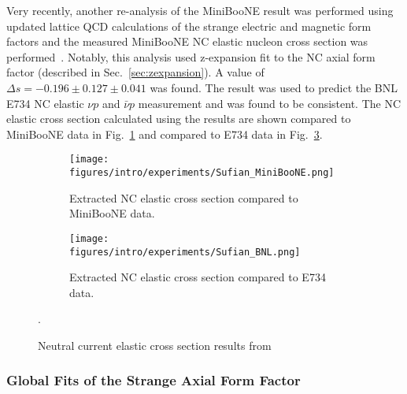   Very recently, another re-analysis of the MiniBooNE result was performed
  using updated lattice QCD calculations of the strange electric and magnetic
  form factors and the measured MiniBooNE NC elastic nucleon cross section
  was performed~\cite{Sufian:2018qtw}. Notably, this analysis used
  z-expansion fit to the NC axial form factor (described in
  Sec.~\ref{sec:zexpansion}). A value of $\Delta s = -0.196\pm 0.127\pm
  0.041$ was found. The result was used to predict the BNL E734 NC elastic
  $\nu p$ and $\bar{\nu} p$ measurement and was found to be consistent. The
  NC elastic cross section calculated using the results are shown compared to
  MiniBooNE data in Fig.~\ref{fig:sufianuboone} and compared to E734 data in
  Fig.~\ref{fig:sufiane734}.
  \begin{figure}[h]
    \centering
    \begin{subfigure}[t]{2.5in}
      \texttt{[image: figures/intro/experiments/Sufian\_MiniBooNE.png]}
      \caption{Extracted NC elastic cross section compared to MiniBooNE data.}
      \label{fig:sufianuboone}
    \end{subfigure}
    \hspace{2pt}
    \begin{subfigure}[t]{2.5in}
      \texttt{[image: figures/intro/experiments/Sufian\_BNL.png]}
      \caption{Extracted NC elastic cross section compared to E734 data.}
      \label{fig:sufiane734}
    \end{subfigure}
    \caption{Neutral current elastic cross section results
    from~\cite{Sufian:2018qtw}}.
    \label{fig:sufiane734}
  \end{figure}

  \subsubsection{Global Fits of the Strange Axial Form Factor}


